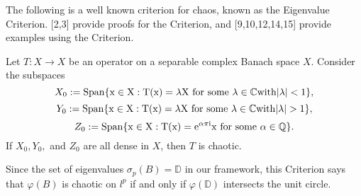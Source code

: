 The following is a well known criterion for chaos, known as the Eigenvalue Criterion.  [2,3] provide proofs for the Criterion, and [9,10,12,14,15] provide examples using the Criterion.

\begin{theorem}
Let $T:X \rightarrow X$ be an operator on a separable complex Banach space $X$.  Consider the subspaces
\[X_0 := \rm{Span}\{x \in X : T(x) = \lambda X \textrm{ for some }\lambda \in \mathbb{C} with |\lambda| < 1\}, \]
\[Y_0 := \rm{Span}\{x \in X : T(x) = \lambda X \textrm{ for some } \lambda \in \mathbb{C} with |\lambda| > 1\},\]
\[Z_0 := \rm{Span}\{x \in X : T(x) = e^{\alpha \pi i}x \textrm{ for some } \alpha \in \mathbb{Q}\}.\]
If $X_0, Y_0,$ and $Z_0$ are all dense in $X$, then $T$ is chaotic.
\end{theorem}

Since the set of eigenvalues $\sigma_p(B) = \mathbb{D}$ in our framework, this Criterion says that $\varphi(B)$ is chaotic on $l^p$ if and only if $\varphi(\mathbb{D})$ intersects the unit circle.